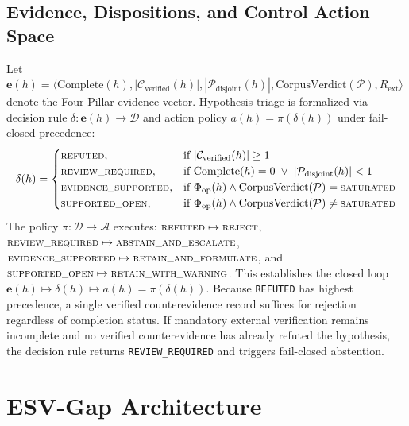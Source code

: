 \documentclass[runningheads]{llncs}
\newcommand{\method}{ESV-Gap}
\begin{document}
\subsection{Evidence, Dispositions, and Control Action Space}
Let $\mathbf{e}(h) = \langle \text{Complete}(h), |\mathcal{C}_{\text{verified}}(h)|, |\mathcal{P}_{\text{disjoint}}(h)|, \text{CorpusVerdict}(\mathcal{P}), R_{\text{ext}} \rangle$ denote the Four-Pillar evidence vector. Hypothesis triage is formalized via decision rule $\delta: \mathbf{e}(h) \rightarrow \mathcal{D}$ and action policy $a(h) = \pi(\delta(h))$ under fail-closed precedence:
\begin{equation}
\label{eq:disposition}
\delta(h) = \begin{cases}
\text{\scriptsize REFUTED}, & \text{if } |\mathcal{C}_{\text{verified}}(h)| \ge 1 \\
\text{\scriptsize REVIEW\_REQUIRED}, & \text{if } \text{Complete}(h) = 0 \;\vee\; |\mathcal{P}_{\text{disjoint}}(h)| < 1 \\
\text{\scriptsize EVIDENCE\_SUPPORTED}, & \text{if } \Phi_{\text{op}}(h) \wedge \text{CorpusVerdict}(\mathcal{P}) = \text{\scriptsize SATURATED} \\
\text{\scriptsize SUPPORTED\_OPEN}, & \text{if } \Phi_{\text{op}}(h) \wedge \text{CorpusVerdict}(\mathcal{P}) \ne \text{\scriptsize SATURATED}
\end{cases}
\end{equation}
The policy $\pi: \mathcal{D} \rightarrow \mathcal{A}$ executes: $\text{\scriptsize REFUTED} \mapsto \text{\scriptsize REJECT}$, $\text{\scriptsize REVIEW\_REQUIRED} \mapsto \text{\scriptsize ABSTAIN\_AND\_ESCALATE}$, $\text{\scriptsize EVIDENCE\_SUPPORTED} \mapsto \text{\scriptsize RETAIN\_AND\_FORMULATE}$, and $\text{\scriptsize SUPPORTED\_OPEN} \mapsto \text{\scriptsize RETAIN\_WITH\_WARNING}$. This establishes the closed loop $\mathbf{e}(h) \mapsto \delta(h) \mapsto a(h) = \pi(\delta(h))$. Because \texttt{REFUTED} has highest precedence, a single verified counterevidence record suffices for rejection regardless of completion status. If mandatory external verification remains incomplete and no verified counterevidence has already refuted the hypothesis, the decision rule returns \texttt{REVIEW\_REQUIRED} and triggers fail-closed abstention.

\section{\method{} Architecture}
\label{sec:arch}
\end{document}
